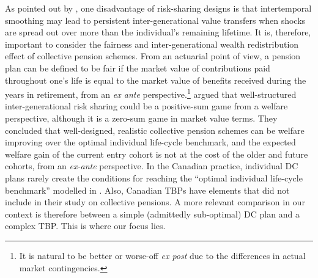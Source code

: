 \documentclass{sfuthesis}
\numberwithin{equation}{chapter}
\begin{document}
	

		\justify
		As pointed out by \citet{Bovenberg2007}, one disadvantage of risk-sharing designs is that intertemporal smoothing may lead to persistent inter-generational value transfers when shocks are spread out over more than the individual’s remaining lifetime. It is, therefore, important to consider the fairness and inter-generational wealth redistribution effect of collective pension schemes. From an actuarial point of view, a pension plan can be defined to be fair if the market value of contributions paid throughout one's life is equal to the market value of benefits received during the years in retirement, from an \textit{ex ante} perspective.\footnote{It is natural to be better or worse-off \textit{ex post} due to the differences in actual market contingencies.} \citet{Cui2011} argued that well-structured inter-generational risk sharing could be a positive-sum game from a welfare perspective, although it is a zero-sum game in market value terms. They concluded that well-designed, realistic collective pension schemes can be welfare improving over the optimal individual life-cycle benchmark, and the expected welfare gain of the current entry cohort is not at the cost of the older and future cohorts, from an \textit{ex-ante} perspective. In the Canadian practice, individual DC plans rarely create the conditions for reaching the ``optimal individual life-cycle benchmark'' modelled in \citet{Cui2011}. Also, Canadian TBPs have elements that \citet{Cui2011} did not include in their study on collective pensions. A more relevant comparison in our context is therefore between a simple (admittedly sub-optimal) DC plan and a complex TBP. This is where our focus lies.

	
\end{document}

